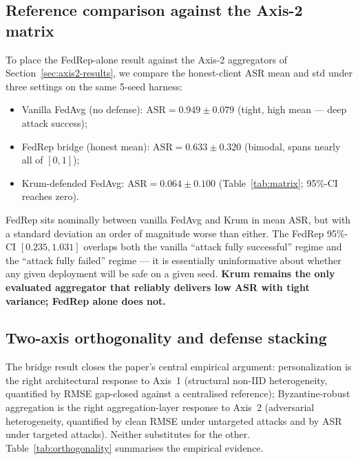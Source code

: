 \documentclass[preprint,12pt,authoryear]{elsarticle}
\begin{document}
\subsection{Reference comparison against the Axis-2 matrix}
\label{sec:bridge-comparison}

To place the FedRep-alone result against the Axis-2 aggregators of
Section~\ref{sec:axis2-results}, we compare the honest-client ASR
mean and std under three settings on the same 5-seed harness:

\begin{itemize}
    \item Vanilla FedAvg (no defense): $\mathrm{ASR} = 0.949 \pm 0.079$ (tight, high mean --- deep attack success);
    \item FedRep bridge (honest mean): $\mathrm{ASR} = 0.633 \pm 0.320$ (bimodal, spans nearly all of $[0, 1]$);
    \item Krum-defended FedAvg: $\mathrm{ASR} = 0.064 \pm 0.100$ (Table~\ref{tab:matrix}; 95\%-CI reaches zero).
\end{itemize}

FedRep sits nominally between vanilla FedAvg and Krum in mean ASR,
but with a standard deviation an order of magnitude worse than
either. The FedRep 95\%-CI $[0.235, 1.031]$ overlaps both the
vanilla ``attack fully successful'' regime and the ``attack fully
failed'' regime --- it is essentially uninformative about whether
any given deployment will be safe on a given seed. \textbf{Krum
remains the only evaluated aggregator that reliably delivers low
ASR with tight variance; FedRep alone does not.}

\subsection{Two-axis orthogonality and defense stacking}
\label{sec:bridge-stacking}

The bridge result closes the paper's central empirical argument:
personalization is the right architectural response to Axis~1
(structural non-IID heterogeneity, quantified by RMSE gap-closed
against a centralised reference); Byzantine-robust aggregation is
the right aggregation-layer response to Axis~2 (adversarial
heterogeneity, quantified by clean RMSE under untargeted attacks
and by ASR under targeted attacks). Neither substitutes for the
other. Table~\ref{tab:orthogonality} summarises the empirical
evidence.
\end{document}
